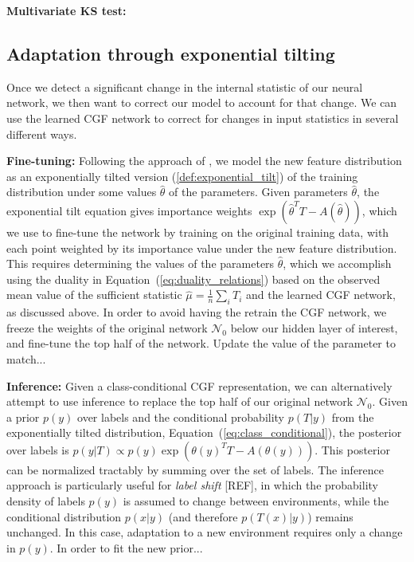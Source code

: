 \documentclass[11pt]{article}      %
\begin{document}
\noindent \textbf{Multivariate KS test:}








\newpage
\subsection{Adaptation through exponential tilting}
Once we detect a significant change in the internal statistic of our neural network, we then want to correct our model to account for that change.
We can use the learned CGF network to correct for changes in input statistics in several different ways.

\noindent \textbf{Fine-tuning:} Following the approach of \cite{maity_understanding_2023}, we model the new feature distribution as an exponentially tilted version (\ref{def:exponential_tilt}) of the training distribution  under some values $\hat \theta$ of the parameters.
Given parameters $\hat \theta$, the exponential tilt equation gives importance weights ${\exp(\hat \theta^T T - A(\hat \theta))}$, which we use to fine-tune the network by training on the original training data, with each point weighted by its importance value under the new feature distribution.
This requires determining the values of the parameters $\hat \theta$, which we accomplish using the duality in Equation~(\ref{eq:duality_relations}) based on the observed mean value of the sufficient statistic ${\hat \mu = \frac{1}{n} \sum_i T_i}$ and the learned CGF network, as discussed above.
In order to avoid having the retrain the CGF network, we freeze the weights of the original network $\mathcal{N}_0$ below our hidden layer of interest, and fine-tune the top half of the network.
Update the value of the parameter to match...


\noindent \textbf{Inference:}
Given a class-conditional CGF representation, we can alternatively attempt to use inference to replace the top half of our original network $\mathcal{N}_0$.
Given a prior $p(y)$ over labels and the conditional probability $p(T|y)$ from the exponentially tilted distribution, Equation~(\ref{eq:class_conditional}), the posterior over labels is $p{(y|T) \propto p(y) \exp(\theta(y)^T T - A(\theta(y)))}$.
This posterior can be normalized tractably by summing over the set of labels.
The inference approach is particularly useful for \textit{label shift} [REF], in which the probability density of labels $p(y)$ is assumed to change between environments, while the conditional distribution $p(x|y)$ (and therefore $p(T(x)|y)$) remains unchanged.
In this case, adaptation to a new environment requires only a change in $p(y)$.
In order to fit the new prior...
\end{document}

